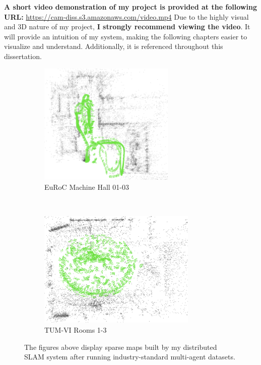 \begin{leftbar}
    \textbf{A short video demonstration of my project is provided at the following URL:} \url{https://cam-diss.s3.amazonaws.com/video.mp4}  \captionbreak Due to the highly visual and 3D nature of my project, \textbf{I strongly recommend viewing the video}. It will provide an intuition of my system, making the following chapters easier to visualize and understand. Additionally, it is referenced throughout this dissertation.
\end{leftbar}

\begin{figure}[h]
    \centering
    \captionsetup{format=plain, labelformat=empty}
    \begin{subfigure}[t]{0.475\linewidth}
        \centering
        \includegraphics[height=2.3in]{figures/euroc_mh_map.png}
        \caption{EuRoC Machine Hall 01-03}
    \end{subfigure}\hfill%
    ~
    \begin{subfigure}[t]{0.475\linewidth}
        \centering
        \includegraphics[height=2.2in]{figures/tum_room_map.png}
        \caption{TUM-VI Rooms 1-3}
    \end{subfigure}

    \caption{The figures above display sparse maps built by my distributed SLAM system after running industry-standard multi-agent datasets.}
    \label{fig:example-maps}
\end{figure}
